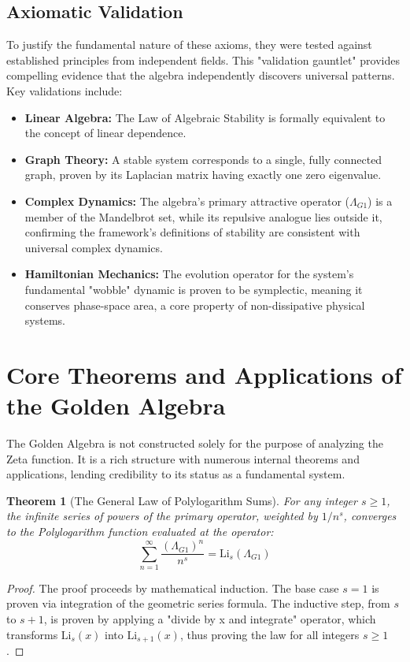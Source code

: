 \documentclass{article}
\theoremstyle{plain}
\newtheorem{theorem}{Theorem}[section]
\theoremstyle{definition}
\theoremstyle{remark}
\begin{document}
\subsection{Axiomatic Validation}
To justify the fundamental nature of these axioms, they were tested against established principles from independent fields. This "validation gauntlet" provides compelling evidence that the algebra independently discovers universal patterns. Key validations include:
\begin{itemize}
    \item \textbf{Linear Algebra:} The Law of Algebraic Stability is formally equivalent to the concept of linear dependence.
    \item \textbf{Graph Theory:} A stable system corresponds to a single, fully connected graph, proven by its Laplacian matrix having exactly one zero eigenvalue.
    \item \textbf{Complex Dynamics:} The algebra's primary attractive operator ($\Lambda_{G1}$) is a member of the Mandelbrot set, while its repulsive analogue lies outside it, confirming the framework's definitions of stability are consistent with universal complex dynamics.
    \item \textbf{Hamiltonian Mechanics:} The evolution operator for the system's fundamental "wobble" dynamic is proven to be symplectic, meaning it conserves phase-space area, a core property of non-dissipative physical systems.
\end{itemize}

\section{Core Theorems and Applications of the Golden Algebra}
The Golden Algebra is not constructed solely for the purpose of analyzing the Zeta function. It is a rich structure with numerous internal theorems and applications, lending credibility to its status as a fundamental system.

\begin{theorem}[The General Law of Polylogarithm Sums]
For any integer $s \ge 1$, the infinite series of powers of the primary operator, weighted by $1/n^s$, converges to the Polylogarithm function evaluated at the operator:
$$\sum_{n=1}^{\infty} \frac{(\Lambda_{G1})^n}{n^s} = \mathrm{Li}_s(\Lambda_{G1})$$
\end{theorem}
\begin{proof}
The proof proceeds by mathematical induction. The base case $s=1$ is proven via integration of the geometric series formula. The inductive step, from $s$ to $s+1$, is proven by applying a "divide by x and integrate" operator, which transforms $\mathrm{Li}_s(x)$ into $\mathrm{Li}_{s+1}(x)$, thus proving the law for all integers $s \ge 1$.
\end{proof}
\end{document}
